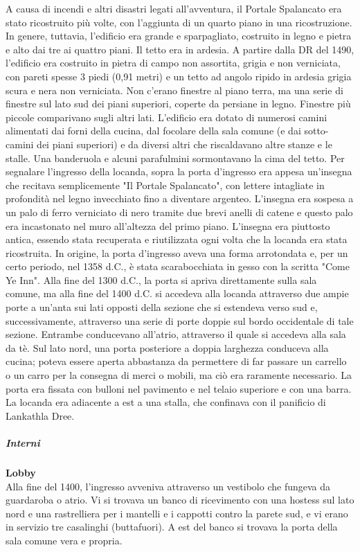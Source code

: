 \documentclass{article}
\begin{document}
A causa di incendi e altri disastri legati all'avventura, il Portale Spalancato era stato ricostruito più volte, con l'aggiunta di un quarto piano in una ricostruzione. In genere, tuttavia, l'edificio era grande e sparpagliato, costruito in legno e pietra e alto dai tre ai quattro piani. Il tetto era in ardesia. A partire dalla DR del 1490, l'edificio era costruito in pietra di campo non assortita, grigia e non verniciata, con pareti spesse 3 piedi (0,91 metri) e un tetto ad angolo ripido in ardesia grigia scura e nera non verniciata. Non c'erano finestre al piano terra, ma una serie di finestre sul lato sud dei piani superiori, coperte da persiane in legno. Finestre più piccole comparivano sugli altri lati. L'edificio era dotato di numerosi camini alimentati dai forni della cucina, dal focolare della sala comune (e dai sotto-camini dei piani superiori) e da diversi altri che riscaldavano altre stanze e le stalle. Una banderuola e alcuni parafulmini sormontavano la cima del tetto.
Per segnalare l'ingresso della locanda, sopra la porta d'ingresso era appesa un'insegna che recitava semplicemente "Il Portale Spalancato", con lettere intagliate in profondità nel legno invecchiato fino a diventare argenteo. L'insegna era sospesa a un palo di ferro verniciato di nero tramite due brevi anelli di catene e questo palo era incastonato nel muro all'altezza del primo piano. L'insegna era piuttosto antica, essendo stata recuperata e riutilizzata ogni volta che la locanda era stata ricostruita.
In origine, la porta d'ingresso aveva una forma arrotondata e, per un certo periodo, nel 1358 d.C., è stata scarabocchiata in gesso con la scritta "Come Ye Inn". Alla fine del 1300 d.C., la porta si apriva direttamente sulla sala comune, ma alla fine del 1400 d.C. si accedeva alla locanda attraverso due ampie porte a un'anta sui lati opposti della sezione che si estendeva verso sud e, successivamente, attraverso una serie di porte doppie sul bordo occidentale di tale sezione. Entrambe conducevano all'atrio, attraverso il quale si accedeva alla sala da tè. Sul lato nord, una porta posteriore a doppia larghezza conduceva alla cucina; poteva essere aperta abbastanza da permettere di far passare un carrello o un carro per la consegna di merci o mobili, ma ciò era raramente necessario. La porta era fissata con bulloni nel pavimento e nel telaio superiore e con una barra.
La locanda era adiacente a est a una stalla, che confinava con il panificio di Lankathla Dree.
\subparagraph{Interni}
\textbf{Lobby} \\ Alla fine del 1400, l'ingresso avveniva attraverso un vestibolo che fungeva da guardaroba o atrio. Vi si trovava un banco di ricevimento con una hostess sul lato nord e una rastrelliera per i mantelli e i cappotti contro la parete sud, e vi erano in servizio tre casalinghi (buttafuori). A est del banco si trovava la porta della sala comune vera e propria.
\end{document}
